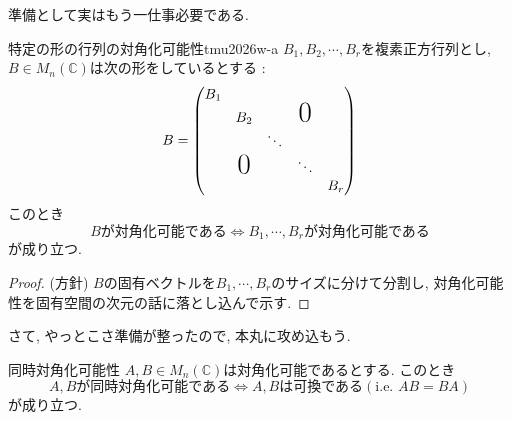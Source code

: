 \documentclass[titlepage]{jsarticle}
\numberwithin{equation}{section}
\newcommand{\C}{\mathbb{C}}%
\begin{document}
準備として実はもう一仕事必要である.
\begin{thm}{特定の形の行列の対角化可能性}{tmu2026w-a}
$B_1, B_2, \cdots, B_r$を複素正方行列とし, $B \in M_n(\C)$は次の形をしているとする : 
\begin{align*}
B=
\begin{pmatrix}
B_ 1                                                           \\
         & B_2           &        & \text{\huge{0}}   \\
         &                      & \ddots                       \\
         & \text{\huge{0}} &        & \ddots             \\
         &                      &        &           & B_r
\end{pmatrix}
\end{align*}
このとき
\[
B\text{が対角化可能である} \iff B_1, \cdots, B_r\text{が対角化可能である}
\]
が成り立つ.
\end{thm}
\begin{proof}
(方針) $B$の固有ベクトルを$B_1, \cdots, B_r$のサイズに分けて分割し, 対角化可能性を固有空間の次元の話に落とし込んで示す.
\end{proof}
さて, やっとこさ準備が整ったので, 本丸に攻め込もう.
\begin{thm}{同時対角化可能性}{}
$A, B \in M_n(\C)$は対角化可能であるとする. このとき
\[
A, B\text{が同時対角化可能である} \iff A, B\text{は可換である} (\text{i.e.}\,\,AB = BA)
\]
が成り立つ.
\end{thm}
\end{document}
